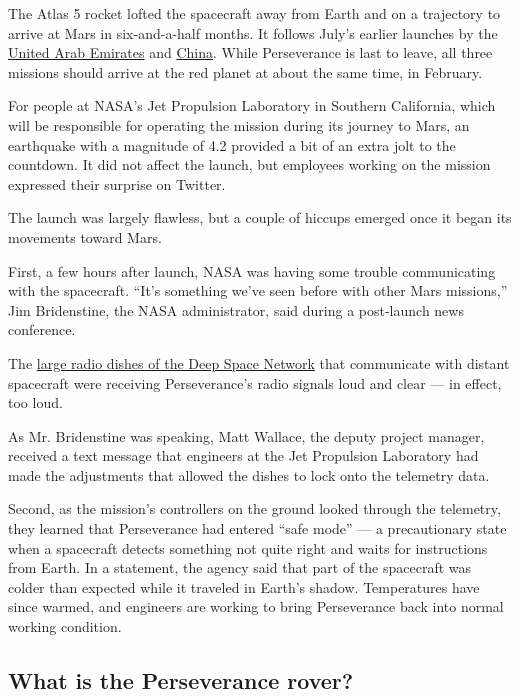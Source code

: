 The Atlas 5 rocket lofted the spacecraft away from Earth and on a
trajectory to arrive at Mars in six-and-a-half months. It follows July's
earlier launches by the
\href{https://www.nytimes.com/2020/07/19/science/emirates-mars-mission.html}{United
Arab Emirates} and
\href{https://www.nytimes.com/2020/07/22/science/mars-china-launch.html}{China}.
While Perseverance is last to leave, all three missions should arrive at
the red planet at about the same time, in February.

For people at NASA's Jet Propulsion Laboratory in Southern California,
which will be responsible for operating the mission during its journey
to Mars, an earthquake with a magnitude of 4.2 provided a bit of an
extra jolt to the countdown. It did not affect the launch, but employees
working on the mission expressed their surprise on Twitter.

The launch was largely flawless, but a couple of hiccups emerged once it
began its movements toward Mars.

First, a few hours after launch, NASA was having some trouble
communicating with the spacecraft. ``It's something we've seen before
with other Mars missions,'' Jim Bridenstine, the NASA administrator,
said during a post-launch news conference.

The
\href{https://www.nytimes.com/2020/03/04/science/voyager-2-nasa-deep-space-network.html}{large
radio dishes of the Deep Space Network} that communicate with distant
spacecraft were receiving Perseverance's radio signals loud and clear
--- in effect, too loud.

As Mr. Bridenstine was speaking, Matt Wallace, the deputy project
manager, received a text message that engineers at the Jet Propulsion
Laboratory had made the adjustments that allowed the dishes to lock onto
the telemetry data.

Second, as the mission's controllers on the ground looked through the
telemetry, they learned that Perseverance had entered ``safe mode'' ---
a precautionary state when a spacecraft detects something not quite
right and waits for instructions from Earth. In a statement, the agency
said that part of the spacecraft was colder than expected while it
traveled in Earth's shadow. Temperatures have since warmed, and
engineers are working to bring Perseverance back into normal working
condition.

\hypertarget{what-is-the-perseverance-rover}{%
\subsection{What is the Perseverance
rover?}\label{what-is-the-perseverance-rover}}

